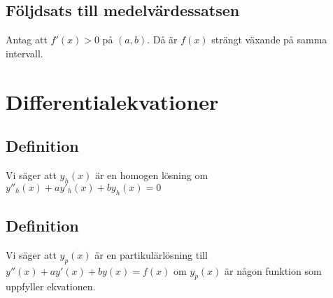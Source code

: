 \documentclass{article}
\begin{document}
\subsection{Följdsats till medelvärdessatsen}
Antag att $f'(x)>0$ på $(a,b)$. Då är $f(x)$ strängt växande på samma intervall.

\newpage
\section{Differentialekvationer}
\subsection{Definition}
Vi säger att $y_{h}(x)$ är en homogen lösning om $y''_{h}(x)+ay'_{h}(x)+by_{h}(x)=0$

\subsection{Definition}
Vi säger att $y_{p}(x)$ är en partikulärlösning till $y''(x)+ay'(x)+by(x)=f(x)$ om $y_{p}(x)$ är någon funktion som uppfyller ekvationen.
\end{document}
